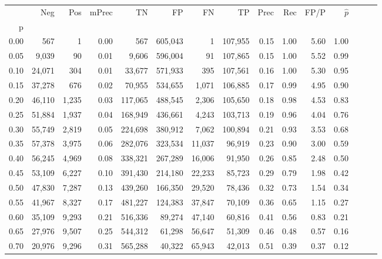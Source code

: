 \begin{tabular}{rrrrrrrrrrrrrrr}
\toprule
{} &     Neg &    Pos & mPrec &       TN &       FP &       FN &       TP &  Prec &   Rec &  FP/P & $\hat{p}$ \\
p    &         &        &       &          &          &          &          &       &       &       &           \\
\midrule
0.00 &     567 &      1 &  0.00 &      567 &  605,043 &        1 &  107,955 &  0.15 &  1.00 &  5.60 &      1.00 \\
0.05 &   9,039 &     90 &  0.01 &    9,606 &  596,004 &       91 &  107,865 &  0.15 &  1.00 &  5.52 &      0.99 \\
0.10 &  24,071 &    304 &  0.01 &   33,677 &  571,933 &      395 &  107,561 &  0.16 &  1.00 &  5.30 &      0.95 \\
0.15 &  37,278 &    676 &  0.02 &   70,955 &  534,655 &    1,071 &  106,885 &  0.17 &  0.99 &  4.95 &      0.90 \\
0.20 &  46,110 &  1,235 &  0.03 &  117,065 &  488,545 &    2,306 &  105,650 &  0.18 &  0.98 &  4.53 &      0.83 \\
0.25 &  51,884 &  1,937 &  0.04 &  168,949 &  436,661 &    4,243 &  103,713 &  0.19 &  0.96 &  4.04 &      0.76 \\
0.30 &  55,749 &  2,819 &  0.05 &  224,698 &  380,912 &    7,062 &  100,894 &  0.21 &  0.93 &  3.53 &      0.68 \\
0.35 &  57,378 &  3,975 &  0.06 &  282,076 &  323,534 &   11,037 &   96,919 &  0.23 &  0.90 &  3.00 &      0.59 \\
0.40 &  56,245 &  4,969 &  0.08 &  338,321 &  267,289 &   16,006 &   91,950 &  0.26 &  0.85 &  2.48 &      0.50 \\
0.45 &  53,109 &  6,227 &  0.10 &  391,430 &  214,180 &   22,233 &   85,723 &  0.29 &  0.79 &  1.98 &      0.42 \\
0.50 &  47,830 &  7,287 &  0.13 &  439,260 &  166,350 &   29,520 &   78,436 &  0.32 &  0.73 &  1.54 &      0.34 \\
0.55 &  41,967 &  8,327 &  0.17 &  481,227 &  124,383 &   37,847 &   70,109 &  0.36 &  0.65 &  1.15 &      0.27 \\
0.60 &  35,109 &  9,293 &  0.21 &  516,336 &   89,274 &   47,140 &   60,816 &  0.41 &  0.56 &  0.83 &      0.21 \\
0.65 &  27,976 &  9,507 &  0.25 &  544,312 &   61,298 &   56,647 &   51,309 &  0.46 &  0.48 &  0.57 &      0.16 \\
0.70 &  20,976 &  9,296 &  0.31 &  565,288 &   40,322 &   65,943 &   42,013 &  0.51 &  0.39 &  0.37 &      0.12 \\

\end{tabular}
